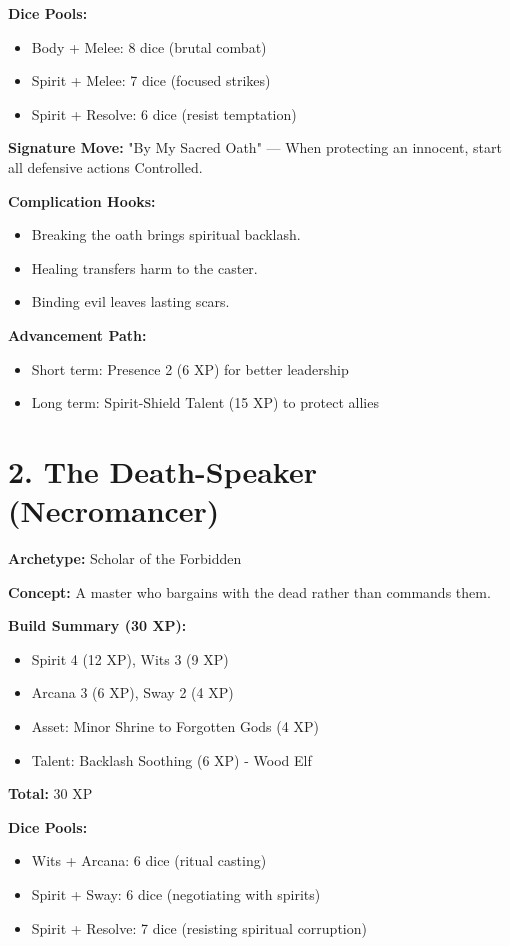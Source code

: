 \textbf{Dice Pools:}
\begin{itemize}
  \item Body + Melee: 8 dice (brutal combat)
  \item Spirit + Melee: 7 dice (focused strikes)
  \item Spirit + Resolve: 6 dice (resist temptation)
\end{itemize}

\textbf{Signature Move:} "By My Sacred Oath" — When protecting an innocent, start all defensive actions Controlled.

\textbf{Complication Hooks:}
\begin{itemize}
  \item Breaking the oath brings spiritual backlash.
  \item Healing transfers harm to the caster.
  \item Binding evil leaves lasting scars.
\end{itemize}

\textbf{Advancement Path:}
\begin{itemize}
  \item Short term: Presence 2 (6 XP) for better leadership
  \item Long term: Spirit-Shield Talent (15 XP) to protect allies
\end{itemize}

\section{2. The Death-Speaker (Necromancer)}
\textbf{Archetype:} Scholar of the Forbidden

\textbf{Concept:} A master who bargains with the dead rather than commands them.

\textbf{Build Summary (30 XP):}
\begin{itemize}
  \item Spirit 4 (12 XP), Wits 3 (9 XP)
  \item Arcana 3 (6 XP), Sway 2 (4 XP)
  \item Asset: Minor Shrine to Forgotten Gods (4 XP)
  \item Talent: Backlash Soothing (6 XP) - Wood Elf
\end{itemize}
\textbf{Total:} 30 XP

\textbf{Dice Pools:}
\begin{itemize}
  \item Wits + Arcana: 6 dice (ritual casting)
  \item Spirit + Sway: 6 dice (negotiating with spirits)
  \item Spirit + Resolve: 7 dice (resisting spiritual corruption)
\end{itemize}

